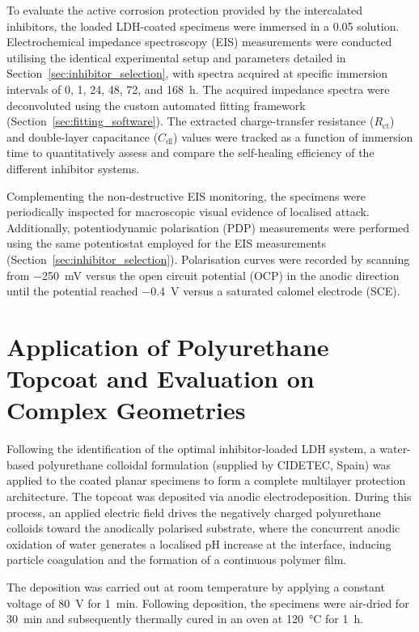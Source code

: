 \documentclass[11pt,twoside,a4paper,final]{report}
\begin{document}
To evaluate the active corrosion protection provided by the intercalated inhibitors, the loaded LDH-coated specimens were immersed in a \qty{0.05}{\molar}  solution. Electrochemical impedance spectroscopy (EIS) measurements were conducted utilising the identical experimental setup and parameters detailed in Section~\ref{sec:inhibitor_selection}, with spectra acquired at specific immersion intervals of 0, 1, 24, 48, 72, and \qty{168}{\hour}. The acquired impedance spectra were deconvoluted using the custom automated fitting framework (Section~\ref{sec:fitting_software}). The extracted charge-transfer resistance ($R_{\text{ct}}$) and double-layer capacitance ($C_{\text{dl}}$) values were tracked as a function of immersion time to quantitatively assess and compare the self-healing efficiency of the different inhibitor systems. 

Complementing the non-destructive EIS monitoring, the specimens were periodically inspected for macroscopic visual evidence of localised attack. Additionally, potentiodynamic polarisation (PDP) measurements were performed using the same potentiostat employed for the EIS measurements (Section~\ref{sec:inhibitor_selection}). Polarisation curves were recorded by scanning from \qty{-250}{\milli\volt} versus the open circuit potential (OCP) in the anodic direction until the potential reached \qty{-0.4}{\volt} versus a saturated calomel electrode (SCE).

\section{Application of Polyurethane Topcoat and Evaluation on Complex Geometries}
\label{sec:topcoat}

Following the identification of the optimal inhibitor-loaded LDH system, a water-based polyurethane colloidal formulation (supplied by CIDETEC, Spain) was applied to the coated planar specimens to form a complete multilayer protection architecture. The topcoat was deposited via anodic electrodeposition. During this process, an applied electric field drives the negatively charged polyurethane colloids toward the anodically polarised substrate, where the concurrent anodic oxidation of water generates a localised pH increase at the interface, inducing particle coagulation and the formation of a continuous polymer film. 

The deposition was carried out at room temperature by applying a constant voltage of \qty{80}{\volt} for \qty{1}{\minute}. Following deposition, the specimens were air-dried for \qty{30}{\minute} and subsequently thermally cured in an oven at \qty{120}{\degreeCelsius} for \qty{1}{\hour}. 
\end{document}

